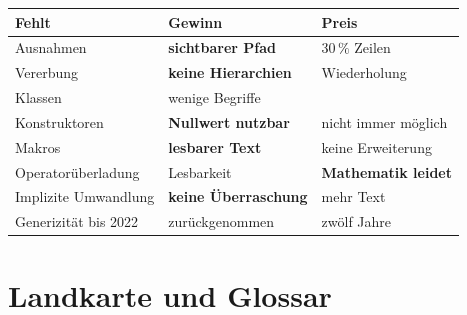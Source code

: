 \begin{merksatz}
\begin{center}
{\small
\renewcommand{\arraystretch}{1.45}
\begin{tabular}{@{}P{2.8cm}P{2.6cm}P{2.6cm}@{}}
\toprule
\textbf{Fehlt} & \textbf{Gewinn} & \textbf{Preis}\\
\midrule
Ausnahmen & \textbf{sichtbarer Pfad} & \textcolor{akzent}{$30\,\%$ Zeilen}\\
Vererbung & \textbf{keine Hierarchien} & \textcolor{akzent}{Wiederholung}\\
Klassen & wenige Begriffe & \\
Konstruktoren & \textbf{Nullwert nutzbar} & \textcolor{akzent}{nicht immer möglich}\\
Makros & \textbf{lesbarer Text} & \textcolor{akzent}{keine Erweiterung}\\
Operator\-überladung & Lesbarkeit & \textcolor{akzent}{\textbf{Mathematik leidet}}\\
Implizite Umwandlung & \textbf{keine Überraschung} & \textcolor{akzent}{mehr Text}\\
Generizität bis 2022 & \textcolor{gruen}{zurück\-genommen} & \textcolor{akzent}{zwölf Jahre}\\
\bottomrule
\end{tabular}}
\end{center}

\begin{center}
\end{center}
\end{merksatz}

\chapter{Landkarte und Glossar}

